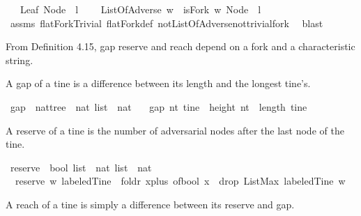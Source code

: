 \begin{isabellebody}
\ \ \ {\isachardoublequoteopen}Leaf\ {\isacharparenleft}Node\ {}\ l{\isacharparenright}{\isachardoublequoteclose}\ \isanewline
\ \ \ {\isachardoublequoteopen}ListOfAdverse\ w\ {\isasymlongleftrightarrow}\ isFork\ w\ {\isacharparenleft}Node\ {}\ l{\isacharparenright}{\isachardoublequoteclose}\isanewline
%
\isadelimproof
\ \ %
\endisadelimproof
%
\isatagproof
{}\isamarkupfalse%
\ assms\ flatFork{\isacharunderscore}Trivial\ flatFork{\isacharunderscore}def\ not{\isacharunderscore}ListOfAdverse{\isacharunderscore}not{\isacharunderscore}trivial{\isacharunderscore}fork\ \isamarkupfalse%
\ blast%
\endisatagproof
{\isafoldproof}%
%
\isadelimproof
%
\endisadelimproof
%
\begin{isamarkuptext}%
From Definition 4.15, gap reserve and reach depend on a fork and a characteristic string.%
\end{isamarkuptext}\isamarkuptrue%
%
\begin{isamarkuptext}%
A gap of a tine is a difference between its length and the longest tine's.%
\end{isamarkuptext}\isamarkuptrue%
\isamarkupfalse%
\ gap\ {\isacharcolon}{\isacharcolon}\ {\isachardoublequoteopen}nattree\ {\isasymRightarrow}\ nat\ list\ {\isasymRightarrow}\ nat{\isachardoublequoteclose}\ \isanewline
\ \ {\isachardoublequoteopen}gap\ nt\ tine\ {\isacharequal}\ height\ nt\ {\isacharminus}\ length\ tine{\isachardoublequoteclose}%
\begin{isamarkuptext}%
A reserve of a tine is the number of adversarial nodes after the last node of the tine.%
\end{isamarkuptext}\isamarkuptrue%
\isamarkupfalse%
\ reserve\ {\isacharcolon}{\isacharcolon}\ {\isachardoublequoteopen}bool\ list\ {\isasymRightarrow}\ nat\ list\ {\isasymRightarrow}\ nat{\isachardoublequoteclose}\ \isanewline
\ \ {\isachardoublequoteopen}reserve\ w\ labeledTine\ {\isacharequal}\ foldr\ {\isacharparenleft}{\isasymlambda}x{\isachardot}{\isacharparenleft}plus\ {\isacharparenleft}of{\isacharunderscore}bool\ x{\isacharparenright}{\isacharparenright}{\isacharparenright}\ \ {\isacharparenleft}drop\ {\isacharparenleft}ListMax\ labeledTine{\isacharparenright}\ w{\isacharparenright}\ {}{\isachardoublequoteclose}%
\begin{isamarkuptext}%
A reach of a tine is simply a difference between its reserve and gap.%
\end{isamarkuptext}\isamarkuptrue%

\end{isabellebody}
